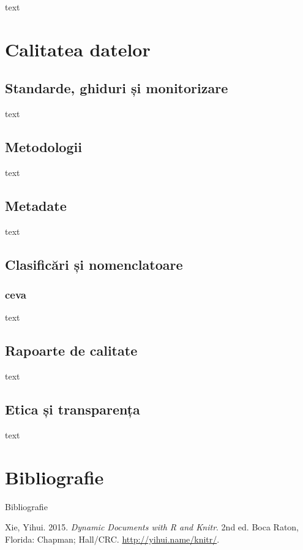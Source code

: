 \documentclass[
  11pt,
  b5paper,
  nottoc]{book}
\newlength{\cslhangindent}
\newenvironment{CSLReferences}[2] %
 {\begin{list}{}{%
  \setlength{\itemindent}{0pt}
  \setlength{\leftmargin}{0pt}
  \setlength{\parsep}{0pt}
  \ifodd #1
   \setlength{\leftmargin}{\cslhangindent}
   \setlength{\itemindent}{-1\cslhangindent}
  \fi
  \setlength{\itemsep}{#2\baselineskip}}}
 {\end{list}}
\begin{document}
text


\chapter{Calitatea datelor}\label{cap7}

\section{Standarde, ghiduri și
monitorizare}\label{standarde-ghiduri-ux219i-monitorizare}

text

\section{Metodologii}\label{metodologii}

text

\section{Metadate}\label{metadate}

text

\section{Clasificări și
nomenclatoare}\label{clasificux103ri-ux219i-nomenclatoare}

\subsection{ceva}\label{ceva}

text

\section{Rapoarte de calitate}\label{rapoarte-de-calitate}

text

\section{Etica și transparența}\label{etica-ux219i-transparenux21ba}

text


\chapter*{Bibliografie}\label{bibliografie}


Bibliografie

\label{refs}
\begin{CSLReferences}{1}{0}
Xie, Yihui. 2015. \emph{Dynamic Documents with {R} and Knitr}. 2nd ed.
Boca Raton, Florida: Chapman; Hall/CRC. \url{http://yihui.name/knitr/}.

\end{CSLReferences}


\backmatter
\end{document}
